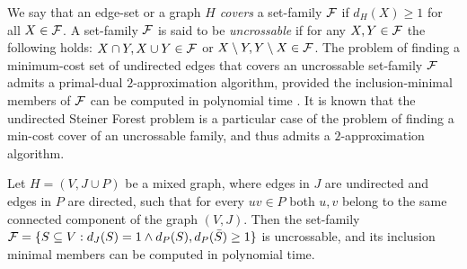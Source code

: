 \documentclass[envcountsame]{llncs}
\begin{document}
We say that an edge-set or a graph $H$ {\em covers} a set-family ${\cal F}$ if 
$d_H(X) \geq 1$ for all $X \in {\cal F}$.
A set-family ${\cal F}$ is said to be {\em uncrossable} if for any $X,Y \in {\cal F}$ 
the following holds: $X \cap Y, X \cup Y \in {\cal F}$ or 
$X \setminus Y,Y \setminus X \in {\cal F}$.
The problem of finding a minimum-cost set of undirected edges that covers an 
uncrossable set-family ${\cal F}$ admits a primal-dual $2$-approximation algorithm, 
provided the inclusion-minimal
members of ${\cal F}$ can be computed in polynomial time \cite{GGPS}.
It is known that the undirected {\sf Steiner Forest} problem is a particular case of the 
problem of finding a min-cost cover of an uncrossable family, and thus admits a 
$2$-approximation algorithm.
 
\begin{lemma} \label{l:F-uncross}
Let $H=(V,J \cup P)$ be a mixed graph, where edges in $J$ are undirected and edges in $P$ are directed, such that for every $uv \in P$ both 
$u,v$ belong to the same connected component of the graph $(V,J)$. Then the set-family 
${\cal F}=\{S \subseteq V: d_J(S)=1 \wedge d_P(S),d_P(\bar{S}) \geq 1\}$ is 
uncrossable, and its inclusion minimal members can be computed in polynomial time.
\end{lemma} 
\end{document}
